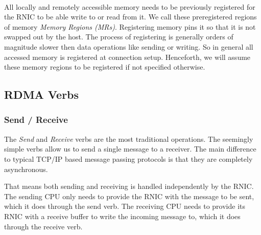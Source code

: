 \paragraph{}  All locally and remotely accessible memory needs to be previously registered for the RNIC to be able write to
or read from it. We call these preregistered regions of memory \emph{Memory Regions (MRs)}.  
Registering memory pins it so that it is not swapped out by the host. The process of registering is generally orders of magnitude slower 
then data operations like sending or writing. So in general all accessed memory is registered at connection setup. Henceforth,  
we will assume these memory regions to be registered if not specified otherwise.



\subsection{RDMA Verbs}\label{sec:bg:verbs}

\subsubsection{Send / Receive} \label{sec:bg:send}
The \emph{Send} and \emph{Receive} verbs are the most traditional operations. The seemingly simple verbs allow 
us to send a single message to  a receiver. The main difference to typical TCP/IP based message passing protocols is that
they are completely asynchronous.

That means both sending and receiving is handled independently by the RNIC. The sending CPU only needs to provide
the RNIC with the message to be sent, which it does through the send verb. The receiving CPU needs to provide its RNIC with 
a receive buffer to write the incoming message to, which it does through the receive verb.




